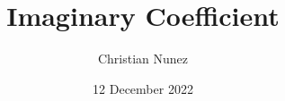 \documentclass[mla8]{mla}
\title{Imaginary Coefficient}
\author{Christian Nunez}
\date{12 December 2022}
\begin{document}
\begin{paper}
\hspace{0.49 in}

\end{paper}
\printbibliography
\end{document}
